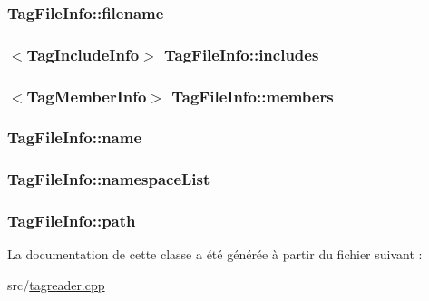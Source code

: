 \subsubsection[{filename}]{ Tag\+File\+Info\+::filename}\label{class_tag_file_info_a4588a4b981099ed4633866a6c5636e6e}
\hypertarget{class_tag_file_info_acc05454624a34a3ce80c22205ace9524}{}
\subsubsection[{includes}]{$<${\bf Tag\+Include\+Info}$>$ Tag\+File\+Info\+::includes}\label{class_tag_file_info_acc05454624a34a3ce80c22205ace9524}
\hypertarget{class_tag_file_info_a007e8381a72298b5fd057c8927384897}{}
\subsubsection[{members}]{$<${\bf Tag\+Member\+Info}$>$ Tag\+File\+Info\+::members}\label{class_tag_file_info_a007e8381a72298b5fd057c8927384897}
\hypertarget{class_tag_file_info_a2419c9a8697d9b7d640ac122c48273b1}{}
\subsubsection[{name}]{ Tag\+File\+Info\+::name}\label{class_tag_file_info_a2419c9a8697d9b7d640ac122c48273b1}
\hypertarget{class_tag_file_info_afba319f8f0d659de73f390627bb91a9e}{}
\subsubsection[{namespace\+List}]{ Tag\+File\+Info\+::namespace\+List}\label{class_tag_file_info_afba319f8f0d659de73f390627bb91a9e}
\hypertarget{class_tag_file_info_ae61e74f02e72cf90e0c27b5d9451a88e}{}
\subsubsection[{path}]{ Tag\+File\+Info\+::path}\label{class_tag_file_info_ae61e74f02e72cf90e0c27b5d9451a88e}


La documentation de cette classe a été générée à partir du fichier suivant \+:\begin{DoxyCompactItemize}
\item 
src/\hyperlink{tagreader_8cpp}{tagreader.\+cpp}\end{DoxyCompactItemize}
